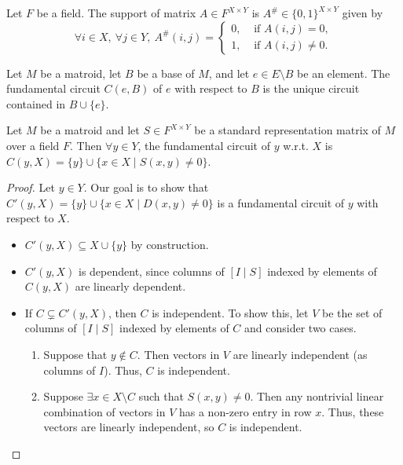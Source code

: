 
\begin{definition}\label{def:support_matrix}
    Let $F$ be a field. The support of matrix $A \in F^{X \times Y}$ is $A^{\#} \in \{0, 1\}^{X \times Y}$ given by
    \[
        \forall i \in X, \ \forall j \in Y, \ A^{\#} (i, j) = \begin{cases}
            0, & \text{ if } A (i, j) = 0, \\
            1, & \text{ if } A (i, j) \neq 0.
        \end{cases}
    \]
\end{definition}

\begin{definition}\label{def:fund_circuit}
    Let $M$ be a matroid, let $B$ be a base of $M$, and let $e \in E \setminus B$ be an element. The fundamental circuit $C (e, B)$ of $e$ with respect to $B$ is the unique circuit contained in $B \cup \{e\}$.
\end{definition}

\begin{lemma}\label{lem:std_repr_fund_circuits}
    Let $M$ be a matroid and let $S \in F^{X \times Y}$ be a standard representation matrix of $M$ over a field $F$. Then $\forall y \in Y$, the fundamental circuit of $y$ w.r.t. $X$ is $C (y, X) = \{y\} \cup \{x \in X \mid S (x, y) \neq 0\}$.
\end{lemma}

\begin{proof}
    Let $y \in Y$. Our goal is to show that $C' (y, X) = \{y\} \cup \{x \in X \mid D (x, y) \neq 0\}$ is a fundamental circuit of $y$ with respect to $X$.
    \begin{itemize}
        \item $C' (y, X) \subseteq X \cup \{y\}$ by construction.
        \item $C' (y, X)$ is dependent, since columns of $[I \mid S]$ indexed by elements of $C (y, X)$ are linearly dependent.
        \item If $C \subsetneq C' (y, X)$, then $C$ is independent. To show this, let $V$ be the set of columns of $[I \mid S]$ indexed by elements of $C$ and consider two cases.
        \begin{enumerate}
            \item Suppose that $y \notin C$. Then vectors in $V$ are linearly independent (as columns of $I$). Thus, $C$ is independent.
            \item Suppose $\exists x \in X \setminus C$ such that $S (x, y) \neq 0$. Then any nontrivial linear combination of vectors in $V$ has a non-zero entry in row $x$. Thus, these vectors are linearly independent, so $C$ is independent.
        \end{enumerate}
    \end{itemize}
\end{proof}

